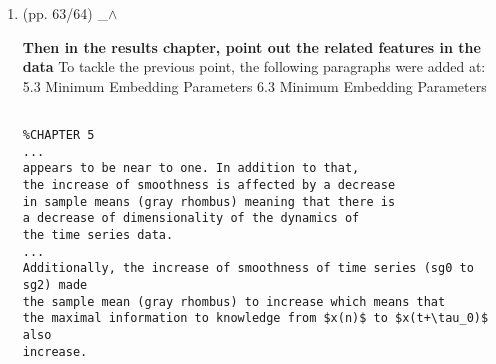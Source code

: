 \documentclass[12pt]{article}
\begin{document}
\begin{enumerate}
	\begin{verbatim}
	

	\subsection{Smoothing time-series}
Applying low-pass filters is a common way to either capture low 
frequencies (below 15 Hz) that represent 99\% of the human body 
energy or to get the gravitational and body motion components of 
accelerations (below 0.3 Hz) \citep{anguita2013}.
However, filtering such information can cut-off frequencies that 
are important for the conservation of  
(i) the original properties of raw time-series data and 
(ii) the structure of the time-series data in terms of width and heights.
In addition to that, arm movements of NAO can sometimes produce 
jerky movements due to: 
(i) the control of dynamic response (fast acceleration/deceleration), 
(ii) the stiffness of the gear mechanism, or 
(iii) the high frequencies of oscillations because of resonances
(see \cite{gouaillier2009} for NAO's mechanical and dynamic 
capabilities). 
Hence, instead of cutting out frequencies with a low-pass filter
for the experiments in the context of human-robot interaction, 
this thesis considers the application of Savitzky-Golay filter 
to smooth time series data.
The latter statement might give insight into the effect 
of smoothness of real-world time series data for 
nonlinear analysis methods.




	\end{verbatim}
	\textit{
	SORTED:  \\
	Sat Apr 20 14:12:27 BST 2019\\
	Mon  6 May 17:31:45 BST 2019 (amended) \\
	Mon 20 May 08:28:09 BST 2019 (polished)
	}
	\\





\item  (pp. 63/64)  \_$\wedge$  

\textbf{
Then in the results chapter, 
point out the related features in the data
}
To tackle the previous point, the following paragraphs were added at:
5.3 Minimum Embedding Parameters
6.3 Minimum Embedding Parameters

	\begin{verbatim}

%CHAPTER 5	
...
appears to be near to one. In addition to that, 
the increase of smoothness is affected by a decrease 
in sample means (gray rhombus) meaning that there is 
a decrease of dimensionality of the dynamics of 
the time series data.
...
Additionally, the increase of smoothness of time series (sg0 to sg2) made 
the sample mean (gray rhombus) to increase which means that 
the maximal information to knowledge from $x(n)$ to $x(t+\tau_0)$ also 
increase.



\end{verbatim}
\end{enumerate}
\end{document}
